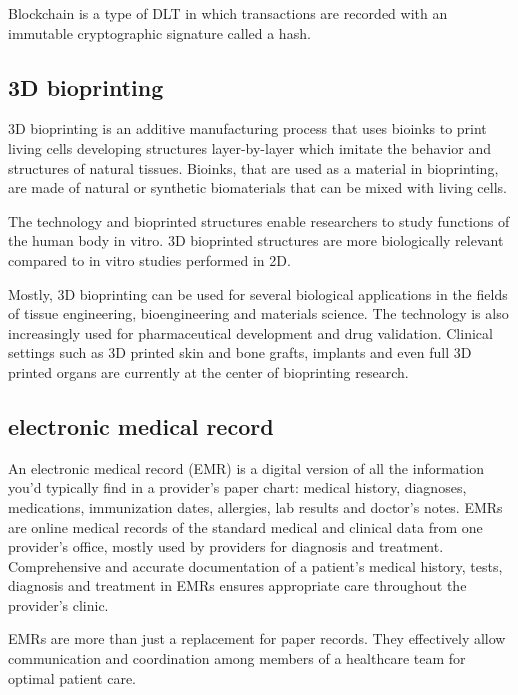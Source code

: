 \documentclass{article}
\begin{document}
Blockchain is a type of DLT in which transactions are recorded with an immutable cryptographic signature called a hash.

\subsection{3D bioprinting}
3D bioprinting is an additive manufacturing process that uses bioinks to print living cells developing structures layer-by-layer which imitate the behavior and structures of natural tissues. Bioinks, that are used as a material in bioprinting, are made of natural or synthetic biomaterials that can be mixed with living cells.

The technology and bioprinted structures enable researchers to study functions of the human body in vitro. 3D bioprinted structures are more biologically relevant compared to in vitro studies performed in 2D.

Mostly, 3D bioprinting can be used for several biological applications in the fields of tissue engineering, bioengineering and materials science. The technology is also increasingly used for pharmaceutical development and drug validation. Clinical settings such as 3D printed skin and bone grafts, implants and even full 3D printed organs are currently at the center of bioprinting research.

\subsection{electronic medical record}
An electronic medical record (EMR) is a digital version of all the information you’d typically find in a provider’s paper chart: medical history, diagnoses, medications, immunization dates, allergies, lab results and doctor’s notes. EMRs are online medical records of the standard medical and clinical data from one provider’s office, mostly used by providers for diagnosis and treatment. Comprehensive and accurate documentation of a patient’s medical history, tests, diagnosis and treatment in EMRs ensures appropriate care throughout the provider’s clinic.

EMRs are more than just a replacement for paper records. They effectively allow communication and coordination among members of a healthcare team for optimal patient care.
%
%
\end{document}
